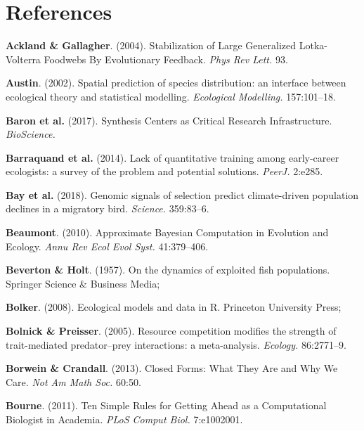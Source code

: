 \documentclass[12pt]{article}
\begin{document}
\hypertarget{references}{%
\section*{References}\label{references}}

\hypertarget{refs}{}
\leavevmode\hypertarget{ref-AcklGall04}{}%
\textbf{Ackland \& Gallagher}. (2004). Stabilization of Large
Generalized Lotka-Volterra Foodwebs By Evolutionary Feedback. \emph{Phys
Rev Lett.} 93.

\leavevmode\hypertarget{ref-Aust02}{}%
\textbf{Austin}. (2002). Spatial prediction of species distribution: an
interface between ecological theory and statistical modelling.
\emph{Ecological Modelling.} 157:101--18.

\leavevmode\hypertarget{ref-BaroSpec17}{}%
\textbf{Baron et al.} (2017). Synthesis Centers as Critical Research
Infrastructure. \emph{BioScience.}

\leavevmode\hypertarget{ref-BarrEzar14}{}%
\textbf{Barraquand et al.} (2014). Lack of quantitative training among
early-career ecologists: a survey of the problem and potential
solutions. \emph{PeerJ.} 2:e285.

\leavevmode\hypertarget{ref-BayHarr18}{}%
\textbf{Bay et al.} (2018). Genomic signals of selection predict
climate-driven population declines in a migratory bird. \emph{Science.}
359:83--6.

\leavevmode\hypertarget{ref-Beau10}{}%
\textbf{Beaumont}. (2010). Approximate Bayesian Computation in Evolution
and Ecology. \emph{Annu Rev Ecol Evol Syst.} 41:379--406.

\leavevmode\hypertarget{ref-BeveHolt57}{}%
\textbf{Beverton \& Holt}. (1957). On the dynamics of exploited fish
populations. Springer Science \& Business Media;

\leavevmode\hypertarget{ref-Bolk08}{}%
\textbf{Bolker}. (2008). Ecological models and data in R. Princeton
University Press;

\leavevmode\hypertarget{ref-BolnPrei05}{}%
\textbf{Bolnick \& Preisser}. (2005). Resource competition modifies the
strength of trait-mediated predator--prey interactions: a meta-analysis.
\emph{Ecology.} 86:2771--9.

\leavevmode\hypertarget{ref-BorwCran13}{}%
\textbf{Borwein \& Crandall}. (2013). Closed Forms: What They Are and
Why We Care. \emph{Not Am Math Soc.} 60:50.

\leavevmode\hypertarget{ref-Bour11}{}%
\textbf{Bourne}. (2011). Ten Simple Rules for Getting Ahead as a
Computational Biologist in Academia. \emph{PLoS Comput Biol.}
7:e1002001.
\end{document}
